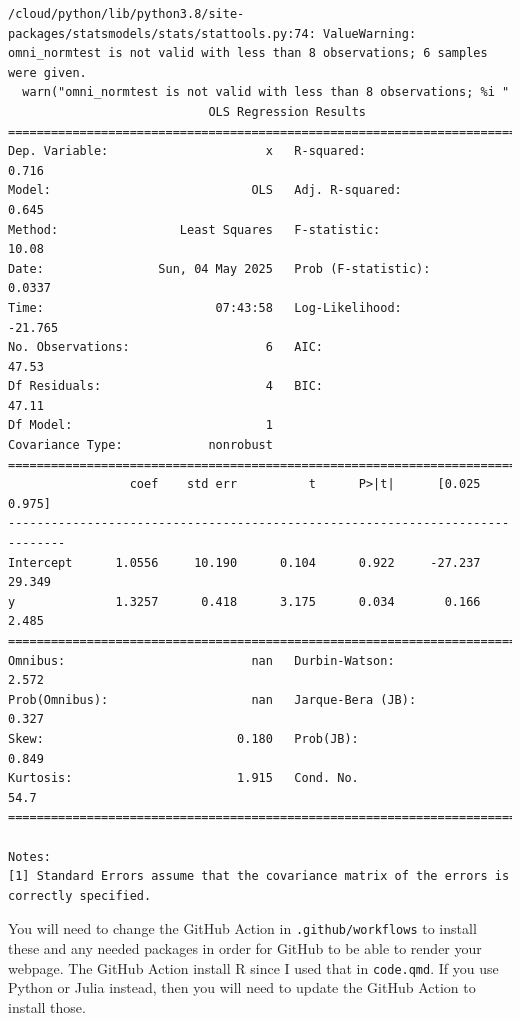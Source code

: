 \documentclass[
  letterpaper,
  oneside,
  open=any]{scrbook}
\begin{document}
\begin{verbatim}
/cloud/python/lib/python3.8/site-packages/statsmodels/stats/stattools.py:74: ValueWarning: omni_normtest is not valid with less than 8 observations; 6 samples were given.
  warn("omni_normtest is not valid with less than 8 observations; %i "
                            OLS Regression Results                            
==============================================================================
Dep. Variable:                      x   R-squared:                       0.716
Model:                            OLS   Adj. R-squared:                  0.645
Method:                 Least Squares   F-statistic:                     10.08
Date:                Sun, 04 May 2025   Prob (F-statistic):             0.0337
Time:                        07:43:58   Log-Likelihood:                -21.765
No. Observations:                   6   AIC:                             47.53
Df Residuals:                       4   BIC:                             47.11
Df Model:                           1                                         
Covariance Type:            nonrobust                                         
==============================================================================
                 coef    std err          t      P>|t|      [0.025      0.975]
------------------------------------------------------------------------------
Intercept      1.0556     10.190      0.104      0.922     -27.237      29.349
y              1.3257      0.418      3.175      0.034       0.166       2.485
==============================================================================
Omnibus:                          nan   Durbin-Watson:                   2.572
Prob(Omnibus):                    nan   Jarque-Bera (JB):                0.327
Skew:                           0.180   Prob(JB):                        0.849
Kurtosis:                       1.915   Cond. No.                         54.7
==============================================================================

Notes:
[1] Standard Errors assume that the covariance matrix of the errors is correctly specified.
\end{verbatim}

You will need to change the GitHub Action in \texttt{.github/workflows}
to install these and any needed packages in order for GitHub to be able
to render your webpage. The GitHub Action install R since I used that in
\texttt{code.qmd}. If you use Python or Julia instead, then you will
need to update the GitHub Action to install those.
\end{document}
